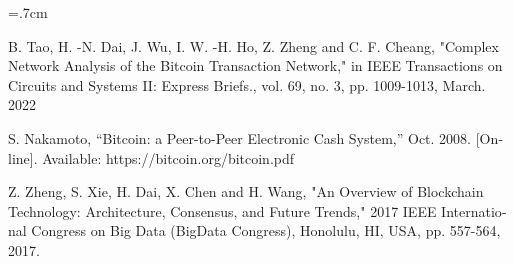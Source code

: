 \renewcommand{\bibname}{مراجع}

\begin{thebibliography}{99}

\begin{latin}

\baselineskip=.7cm

\noindent B. Tao, H. -N. Dai, J. Wu, I. W. -H. Ho, Z. Zheng and C. F. Cheang, "Complex Network Analysis of the
Bitcoin Transaction Network," in IEEE Transactions on Circuits and Systems II: Express Briefs., vol. 69,
no. 3, pp. 1009-1013, March. 2022

\noindent S. Nakamoto, “Bitcoin: a Peer-to-Peer Electronic Cash System,” Oct. 2008. [Online]. Available:
https://bitcoin.org/bitcoin.pdf

\noindent Z. Zheng, S. Xie, H. Dai, X. Chen and H. Wang, "An Overview of Blockchain Technology: Architecture,
Consensus, and Future Trends," 2017 IEEE International Congress on Big Data (BigData Congress),
Honolulu, HI, USA, pp. 557-564, 2017.


\end{latin}

\end{thebibliography}